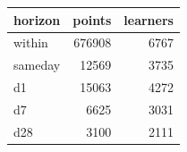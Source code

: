 \begin{tabular}{lrr}
\toprule
horizon & points & learners \\
\midrule
within & 676908 & 6767 \\
sameday & 12569 & 3735 \\
d1 & 15063 & 4272 \\
d7 & 6625 & 3031 \\
d28 & 3100 & 2111 \\
\bottomrule
\end{tabular}
